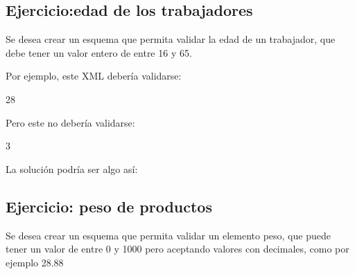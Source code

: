 \documentclass[letterpaper,10pt,spanish]{sphinxmanual}
\begin{document}
\subsection{Ejercicio:edad de los trabajadores}
\label{\detokenize{tema5:ejercicio-edad-de-los-trabajadores}}
Se desea crear un esquema que permita validar la edad de un trabajador, que debe tener un valor entero de entre 16 y 65.

Por ejemplo, este XML debería validarse:

\begin{sphinxVerbatim}[commandchars=\\\{\}]
28
\end{sphinxVerbatim}

Pero este no debería validarse:

\begin{sphinxVerbatim}[commandchars=\\\{\}]
\PYGZhy{}3
\end{sphinxVerbatim}

La solución podría ser algo así:

\begin{sphinxVerbatim}[commandchars=\\\{\}]
     
     
         
             
             
\end{sphinxVerbatim}


\subsection{Ejercicio: peso de productos}
\label{\detokenize{tema5:ejercicio-peso-de-productos}}
Se desea crear un esquema que permita validar un elemento peso, que puede tener un valor de entre 0 y 1000 pero aceptando valores con decimales, como por ejemplo 28.88
\end{document}
